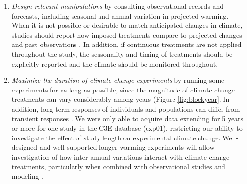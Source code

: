 \documentclass{article}
\begin{document}
\begin{enumerate}
\item\textit{Design relevant manipulations} by consulting observational records and forecasts, including seasonal and annual variation in projected warming. When it is not possible or desirable to match anticipated changes in climate, studies should report how imposed treatments compare to projected changes and past observations \citep[e.g.,][]{hoover2014, zhu2016}. In addition, if continuous treatments are not applied throughout the study, the seasonality and timing of treatments should be explicitly reported and the climate should be monitored throughout.

\item\textit{Maximize the duration of climate change experiments} by running some experiments for as long as possible, since the magnitude of climate change treatments can vary considerably among years (Figure \ref{fig:blockyear}. In addition, long-term responses of individuals and populations can differ from transient responses \citep{saleska2002,franklin1989,giasson2013,harte2015}. We were only able to acquire data extending for 5 years or more for one study in the C3E database (exp01), restricting our ability to investigate the effect of study length on experimental climate change. Well-designed and well-supported longer warming experiments will allow investigation of how inter-annual variations interact with climate change treatments, particularly when combined with observational studies and modeling \citep{luo2011}.

\end{enumerate}


\clearpage
\end{document}
